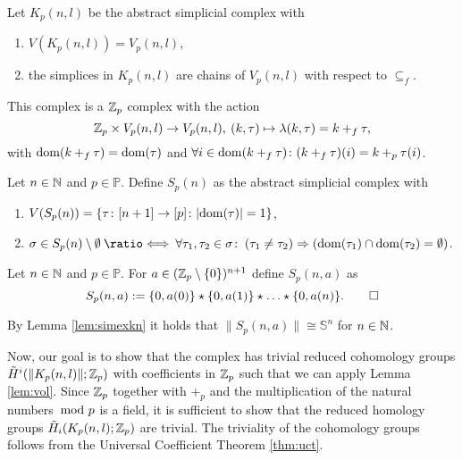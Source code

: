 \begin{defin}\label{defin:kpnl}
  Let $K_p(n,l)$ be the abstract simplicial complex with
  \begin{enumerate}[label=\roman*.)]
    \item $V(K_p(n,l)) = V_p(n,l)$,
    \item the simplices in $K_p(n,l)$ are chains of $V_p(n,l)$ with respect to $\subseteq_f$.
  \end{enumerate}
  This complex is a $\mathbb{Z}_p$ complex with the action
  \begin{equation*}
    \mathbb{Z}_p \times V_p(n,l) \to V_p(n,l), \: (k, \tau) \mapsto \lambda(k, \tau) = k +_f \tau,
  \end{equation*}
  with ${\rm dom}(k +_f \tau) = {\rm dom}(\tau)$ and $\forall i\in {\rm dom}(k +_f \tau)\colon (k+_f\tau)(i) = k +_p \tau(i)$.\qedhere
\end{defin}

\begin{defin}
  Let $n \in \mathbb{N}$ and $p \in \mathbb{P}$. Define $S_p(n)$ as the abstract simplicial complex with
  \begin{enumerate}[label=\roman*.)]
    \item $V(S_p(n)) = \{\tau\colon [n+1]\to [p]\colon |{\rm dom}(\tau)| = 1\}$,
    \item $\sigma \in S_p(n)\setminus\emptyset \: \longeq \: \forall \tau_1,\tau_2\in\sigma\colon \: (\tau_1 \neq \tau_2) \Rightarrow (\dom(\tau_1) \cap \dom(\tau_2) = \emptyset)$.\qedhere
  \end{enumerate}
\end{defin}

\begin{defin}
  Let $n \in \mathbb{N}$ and $p\in\mathbb{P}$. For $a \in (\mathbb{Z}_p\setminus\{0\})^{n+1}$ define $S_p(n,a)$ as
  \begin{equation*}
    S_p(n,a) := \{0, a(0)\} \star \{0,a(1)\} \star \ldots \star \{0,a(n)\}.\qedhere
  \end{equation*}
\end{defin}

\begin{rem}\label{rem:s}
  By Lemma \ref{lem:simexkn} it holds that $\lVert S_p(n,a) \rVert \cong \mathbb{S}^{n}$ for $n\in\mathbb{N}$.
\end{rem}

Now, our goal is to show that the complex has trivial reduced cohomology groups $\tilde{H}^i(\lVert K_p(n,l)\rVert; \mathbb{Z}_p)$ with coefficients in $\mathbb{Z}_p$ such that we can apply Lemma \ref{lem:vol}. Since $\mathbb{Z}_p$ together with $+_p$ and the multiplication of the natural numbers $\hspace*{-5px}\mod p$ is a field, it is sufficient to show that the reduced homology groups $\tilde{H}_i(K_p(n,l); \mathbb{Z}_p)$ are trivial. The triviality of the cohomology groups follows from the Universal Coefficient Theorem \ref{thm:uct}. 

